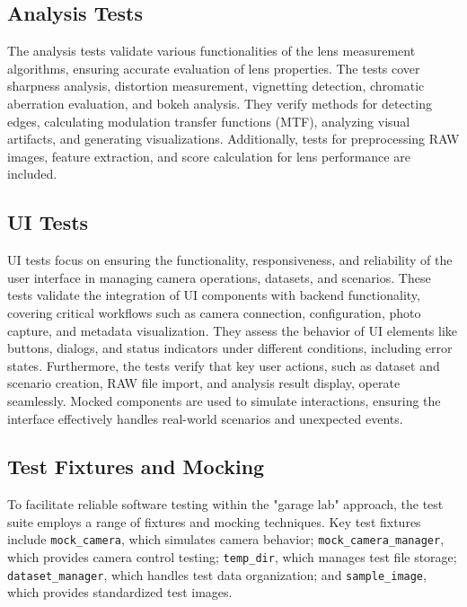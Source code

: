 \subsection{Analysis Tests}

The analysis tests validate various functionalities of the lens measurement algorithms, ensuring accurate evaluation of lens properties. The tests cover sharpness analysis, distortion measurement, vignetting detection, chromatic aberration evaluation, and bokeh analysis. They verify methods for detecting edges, calculating modulation transfer functions (MTF), analyzing visual artifacts, and generating visualizations. Additionally, tests for preprocessing RAW images, feature extraction, and score calculation for lens performance are included.

\subsection{UI Tests}

UI tests focus on ensuring the functionality, responsiveness, and reliability of the user interface in managing camera operations, datasets, and scenarios. These tests validate the integration of UI components with backend functionality, covering critical workflows such as camera connection, configuration, photo capture, and metadata visualization. They assess the behavior of UI elements like buttons, dialogs, and status indicators under different conditions, including error states. Furthermore, the tests verify that key user actions, such as dataset and scenario creation, RAW file import, and analysis result display, operate seamlessly. Mocked components are used to simulate interactions, ensuring the interface effectively handles real-world scenarios and unexpected events.

\subsection{Test Fixtures and Mocking}

To facilitate reliable software testing within the "garage lab" approach, the test suite employs a range of fixtures and mocking techniques. Key test fixtures include \texttt{mock\_camera}, which simulates camera behavior; \texttt{mock\_camera\_manager}, which provides camera control testing; \texttt{temp\_dir}, which manages test file storage; \texttt{dataset\_manager}, which handles test data organization; and \texttt{sample\_image}, which provides standardized test images.

